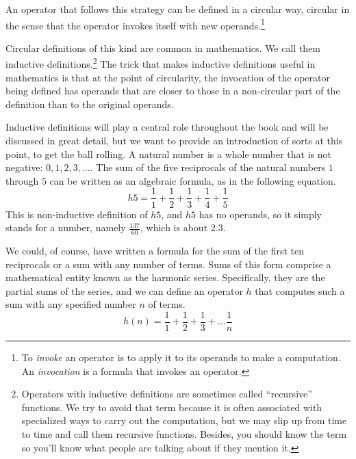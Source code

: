 An operator that follows this strategy can be defined
in a circular way, circular in the sense that
the operator invokes itself with new operands.\footnote{To
\emph{invoke}
an operator is to apply it to its operands
to make a computation.
An \emph{invocation} is a formula that invokes an operator.}

Circular definitions of this kind are common in mathematics.
We call them inductive definitions.\footnote{Operators with
inductive definitions
are sometimes called ``recursive'' functions.
We try to avoid that term because it is
often associated with specialized ways to carry out the computation,
but we may slip up from time to time and call them recursive functions.
Besides, you should know the term so you'll know what people are
talking about if they mention it.}
The trick that makes inductive definitions useful in mathematics
is that at the point of circularity,
the invocation of the operator being defined
has operands that are closer to those in a non-circular part of the
definition than to the original operands.

Inductive definitions
will play a central role throughout the book
and will be discussed in great detail, but we want to provide an
introduction of sorts at this point, to get the ball rolling.
A natural number is a whole number that is not negative: $0, 1, 2, 3, \dots$.
The sum of the five reciprocals of the
natural numbers $1$ through $5$
can be written as an algebraic formula, as in the following equation.
\begin{displaymath}
h5 = \frac{1}{1} + \frac{1}{2} + \frac{1}{3} + \frac{1}{4} + \frac{1}{5}
\end{displaymath}
This is non-inductive definition of $h5$,
and $h5$ has no operands, so it simply stands for a number,
namely $\frac{137}{60}$, which is about $2.3$.

We could, of course, have written a formula for the sum
of the first ten reciprocals or a sum with any number of terms.
Sums of this form comprise a mathematical entity known as
the harmonic series.
Specifically, they are the partial sums of the series,
and we can define an operator $h$ that computes such a sum
with any specified number $n$ of terms.
\begin{displaymath}
h(n) = \frac{1}{1} + \frac{1}{2} + \frac{1}{3} + \dots  \frac{1}{n}
\end{displaymath}

